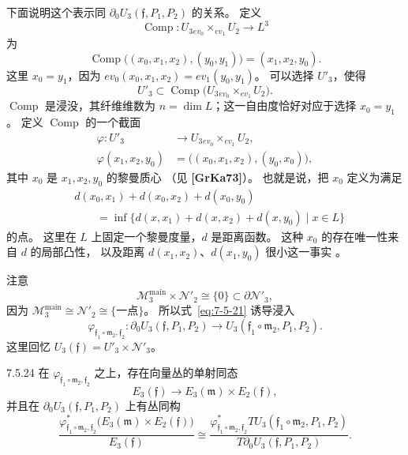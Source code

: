 下面说明这个表示同
$\partial_0U_3(\mathfrak f,P_1,P_2)$ 的关系。
定义
\[
\operatorname{Comp}\colon
U_3{}_{ev_0}\!\mathbin{\times_{ev_1}}U_2
\longrightarrow L^3
\]
为
\[
\operatorname{Comp}
\bigl((x_0,x_1,x_2),(y_0,y_1)\bigr)
=(x_1,x_2,y_0).
\]
这里 $x_0=y_1$，因为
$ev_0(x_0,x_1,x_2)=ev_1(y_0,y_1)$。
可以选择 $U'_3$，使得
\[
U'_3\subset
\operatorname{Comp}
\bigl(U_3{}_{ev_0}\!\mathbin{\times_{ev_1}}U_2\bigr).
\]
$\operatorname{Comp}$ 是浸没，其纤维维数为
$n=\dim L$；这一自由度恰好对应于选择 $x_0=y_1$。
定义 $\operatorname{Comp}$ 的一个截面
\begin{equation}
\begin{aligned}
\varphi\colon U'_3&\longrightarrow
U_3{}_{ev_0}\!\mathbin{\times_{ev_1}}U_2,\\
\varphi(x_1,x_2,y_0)
&=\bigl((x_0,x_1,x_2),(y_0,x_0)\bigr),
\end{aligned}
\tag{7.5.21}\label{eq:7-5-21}
\end{equation}
其中 $x_0$ 是 $x_1,x_2,y_0$ 的黎曼质心
（见 \textbf{[GrKa73]}）。
也就是说，把 $x_0$ 定义为满足
\begin{equation}
\begin{aligned}
&d(x_0,x_1)+d(x_0,x_2)+d(x_0,y_0)\\
&\qquad={}
\inf\{d(x,x_1)+d(x,x_2)+d(x,y_0)\mid x\in L\}
\end{aligned}
\tag{7.5.22}\label{eq:7-5-22}
\end{equation}
的点。
这里在 $L$ 上固定一个黎曼度量，$d$ 是距离函数。
这种 $x_0$ 的存在唯一性来自 $d$ 的局部凸性，
以及距离 $d(x_1,x_2)$、$d(x_1,y_0)$ 很小这一事实
。

注意
\[
\mathcal M_3^{\mathrm{main}}\times\mathcal N'_2
\cong\{0\}\subset\partial\mathcal N'_3,
\]
因为
$\mathcal M_3^{\mathrm{main}}\cong\mathcal N'_2
\cong\{\text{一点}\}$。
所以式~\eqref{eq:7-5-21} 诱导浸入
\[
\varphi_{\mathfrak f_1\circ\mathfrak m_2,\mathfrak f_2}
\colon
\partial_0U_3(\mathfrak f,P_1,P_2)
\longrightarrow
U_3(\mathfrak f_1\circ\mathfrak m_2,P_1,P_2).
\]
这里回忆
$U_3(\mathfrak f)=U'_3\times\mathcal N'_3$。

\begin{lemma}{7.5.24}\label{lem:7-5-24}
在
$\varphi_{\mathfrak f_1\circ\mathfrak m_2,\mathfrak f_2}$
之上，存在向量丛的单射同态
\[
E_3(\mathfrak f)
\longrightarrow E_3(\mathfrak m)\times E_2(\mathfrak f),
\]
并且在 $\partial_0U_3(\mathfrak f,P_1,P_2)$ 上有丛同构
\begin{equation}
\frac{
\varphi_{\mathfrak f_1\circ\mathfrak m_2,\mathfrak f_2}^*
\bigl(E_3(\mathfrak m)\times E_2(\mathfrak f)\bigr)}
{E_3(\mathfrak f)}
\cong
\frac{
\varphi_{\mathfrak f_1\circ\mathfrak m_2,\mathfrak f_2}^*
T U_3(\mathfrak f_1\circ\mathfrak m_2,P_1,P_2)}
{T\partial_0U_3(\mathfrak f,P_1,P_2)}.
\tag{7.5.25}\label{eq:7-5-25}
\end{equation}
\end{lemma}

